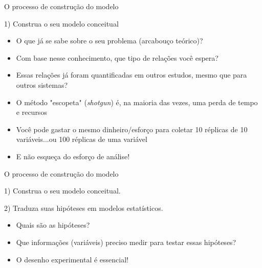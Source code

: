 \documentclass{beamer}\usepackage[]{graphicx}\usepackage[]{color}
\begin{document}
\begin{frame}[t]{O processo de construção do modelo}
\begin{small}


1) Construa o seu modelo conceitual
\vfill
\begin{itemize}
\item O que já se sabe sobre o seu problema (arcabouço teórico)? \pause
\vfill
\item Com base nesse conhecimento, que tipo de relações você espera? \pause
\vfill
\item Essas relações já foram quantificadas em outros estudos, mesmo que para outros sistemas? \pause
\vfill
\item O método "escopeta" (\emph{shotgun}) é, na maioria das vezes, uma perda de tempo e recursos \pause
\vfill
\item Você pode gastar o mesmo dinheiro/esforço para coletar 10 réplicas de 10 variáveis...ou 100 réplicas de uma variável \pause
\vfill
\item E não esqueça do esforço de análise!
\end{itemize}

\end{small}
\end{frame}

\begin{frame}[t]{O processo de construção do modelo}
\begin{small}

1) Construa o seu modelo conceitual.

2) \pause Traduza suas hipóteses em modelos estatísticos.
\vfill
\begin{itemize}

\item Quais são as hipóteses? \pause

\vfill

\item Que informações (variáveis) preciso medir para testar essas hipóteses? \pause

\vfill

\item O desenho experimental é essencial!

\end{itemize}

\end{small}
\end{frame}
\end{document}
